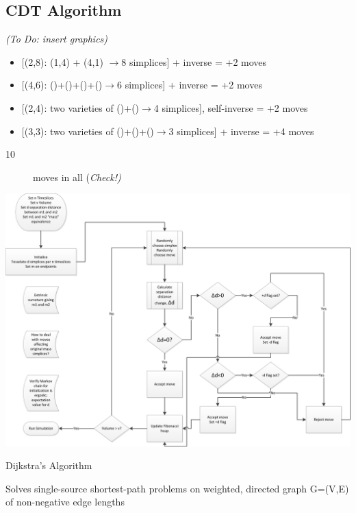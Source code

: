 \documentclass{article}
\begin{document}
\subsection{CDT Algorithm}

\emph{(To Do: insert graphics)}

\begin{itemize}
\item {[}(2,8): (1,4) + (4,1) $\rightarrow$8 simplices{]} + inverse = +2
moves
\item {[}(4,6): ()+()+()+()$\rightarrow$6 simplices{]} + inverse = +2 moves
\item {[}(2,4): two varieties of ()+()$\rightarrow$4 simplices{]}, self-inverse
= +2 moves
\item {[}(3,3): two varieties of ()+()+()$\rightarrow$3 simplices{]} +
inverse = +4 moves\end{itemize}
\begin{description}
\item [{10}] moves in all (\emph{Check!)}
\end{description}

\includegraphics[scale=0.35]{Initialization}

Dijkstra's Algorithm \cite{cormen2001introduction}


Solves single-source shortest-path problems on weighted, directed
graph G=(V,E) of non-negative edge lengths
\end{document}

